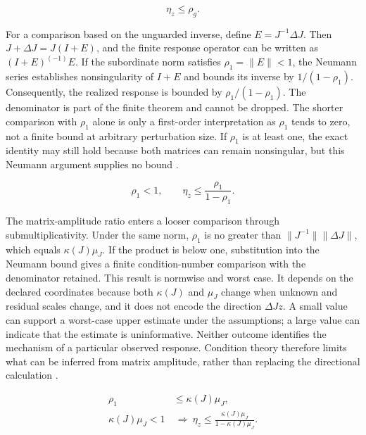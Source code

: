 \documentclass[preprint,12pt]{elsarticle}
\begin{document}
\begin{linenomath*}
\begin{equation}
\eta_z \leq \rho_g.
\label{eq:guarded_inverse_bound}
\end{equation}
\end{linenomath*}

For a comparison based on the unguarded inverse, define $E = J^{-1} \Delta J$. Then $J + \Delta J = J(I + E)$, and the finite response operator can be written as $(I + E)^(-1)E$. If the subordinate norm satisfies $\rho_1 = \lVert E \rVert < 1$, the Neumann series establishes nonsingularity of $I+E$ and bounds its inverse by $1/(1-\rho_1)$. Consequently, the realized response is bounded by $\rho_1/(1-\rho_1)$. The denominator is part of the finite theorem and cannot be dropped. The shorter comparison with $\rho_1$ alone is only a first-order interpretation as $\rho_1$ tends to zero, not a finite bound at arbitrary perturbation size. If $\rho_1$ is at least one, the exact identity may still hold because both matrices can remain nonsingular, but this Neumann argument supplies no bound \cite{S02,S03}.

\begin{linenomath*}
\begin{equation}
\rho_1<1,\qquad
\eta_z \leq \frac{\rho_1}{1-\rho_1}.
\label{eq:neumann_bound}
\end{equation}
\end{linenomath*}

The matrix-amplitude ratio enters a looser comparison through submultiplicativity. Under the same norm, $\rho_1$ is no greater than $\lVert J^{-1} \rVert \lVert \Delta J \rVert$, which equals $\kappa(J) \mu_J$. If the product is below one, substitution into the Neumann bound gives a finite condition-number comparison with the denominator retained. This result is normwise and worst case. It depends on the declared coordinates because both $\kappa(J)$ and $\mu_J$ change when unknown and residual scales change, and it does not encode the direction $\Delta J z$. A small value can support a worst-case upper estimate under the assumptions; a large value can indicate that the estimate is uninformative. Neither outcome identifies the mechanism of a particular observed response. Condition theory therefore limits what can be inferred from matrix amplitude, rather than replacing the directional calculation \cite{S01,S03}.

\begin{linenomath*}
\begin{equation}
\begin{aligned}
\rho_1 &\leq \kappa(J)\mu_J,\\
\kappa(J)\mu_J<1 &\ \Longrightarrow\ 
\eta_z\leq\frac{\kappa(J)\mu_J}{1-\kappa(J)\mu_J}.
\end{aligned}
\label{eq:condition_comparison}
\end{equation}
\end{linenomath*}
\end{document}
